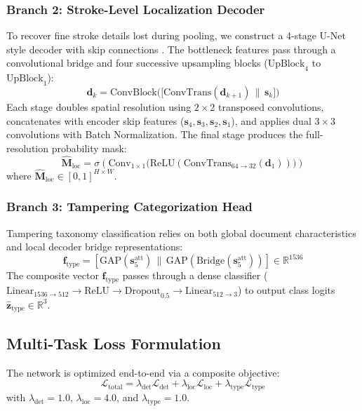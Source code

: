 \documentclass[runningheads]{llncs}
\begin{document}
\subsubsection{Branch 2: Stroke-Level Localization Decoder}
To recover fine stroke details lost during pooling, we construct a 4-stage U-Net style decoder with skip connections \cite{bib6}. The bottleneck features pass through a convolutional bridge and four successive upsampling blocks ($\text{UpBlock}_4$ to $\text{UpBlock}_1$):
\begin{equation}
\mathbf{d}_k = \text{ConvBlock}\Big(\big[\text{ConvTrans}(\mathbf{d}_{k+1}) \,\|\, \mathbf{s}_k\big]\Big)\label{eq_upblock}
\end{equation}
Each stage doubles spatial resolution using $2 \times 2$ transposed convolutions, concatenates with encoder skip features ($\mathbf{s}_4, \mathbf{s}_3, \mathbf{s}_2, \mathbf{s}_1$), and applies dual $3 \times 3$ convolutions with Batch Normalization. The final stage produces the full-resolution probability mask:
\begin{equation}
\hat{\mathbf{M}}_{\text{loc}} = \sigma\left(\text{Conv}_{1 \times 1}\big(\text{ReLU}(\text{ConvTrans}_{64 \rightarrow 32}(\mathbf{d}_1))\big)\right)\label{eq_seg_head}
\end{equation}
where $\hat{\mathbf{M}}_{\text{loc}} \in [0, 1]^{H \times W}$.

\subsubsection{Branch 3: Tampering Categorization Head}
Tampering taxonomy classification relies on both global document characteristics and local decoder bridge representations:
\begin{equation}
\mathbf{f}_{\text{type}} = [\text{GAP}(\mathbf{s}_5^{\text{att}}) \,\|\, \text{GAP}(\text{Bridge}(\mathbf{s}_5^{\text{att}}))] \in \mathbb{R}^{1536}\label{eq_type_feat}
\end{equation}
The composite vector $\mathbf{f}_{\text{type}}$ passes through a dense classifier ($\text{Linear}_{1536 \rightarrow 512} \rightarrow \text{ReLU} \rightarrow \text{Dropout}_{0.5} \rightarrow \text{Linear}_{512 \rightarrow 3}$) to output class logits $\hat{\mathbf{z}}_{\text{type}} \in \mathbb{R}^3$.

\subsection{Multi-Task Loss Formulation}\label{subsec4_5}
The network is optimized end-to-end via a composite objective:
\begin{equation}
\mathcal{L}_{\text{total}} = \lambda_{\text{det}} \mathcal{L}_{\text{det}} + \lambda_{\text{loc}} \mathcal{L}_{\text{loc}} + \lambda_{\text{type}} \mathcal{L}_{\text{type}}\label{eq_loss_total}
\end{equation}
with $\lambda_{\text{det}} = 1.0$, $\lambda_{\text{loc}} = 4.0$, and $\lambda_{\text{type}} = 1.0$.
\end{document}
